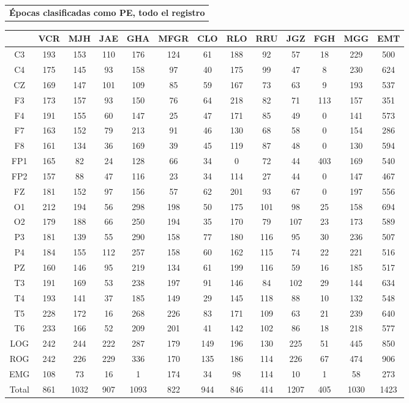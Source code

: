 \documentclass[12pt,a4paper]{mitthesis}
\begin{document}

\begin{SidewaysFigure}
\centering
\begin{tabular}{c}
\textbf{\'Epocas clasificadas como PE, todo el registro}
\vspace{1em}
\end{tabular}
\begin{tabular}{c|ccccc|cccc|ccc}
& VCR & MJH & JAE & GHA & MFGR
& CLO & RLO & RRU & JGZ
& FGH & MGG & EMT \\
\hline
C3&193&153&110&176&124&61&188&92&57&18&229&500 \\
C4&175&145&93&158&97&40&175&99&47&8&230&624 \\
CZ&169&147&101&109&85&59&167&73&63&9&193&537 \\
F3&173&157&93&150&76&64&218&82&71&113&157&351 \\
F4&191&155&60&147&25&47&171&85&49&0&141&573 \\
F7&163&152&79&213&91&46&130&68&58&0&154&286 \\
F8&161&134&36&169&39&45&119&87&48&0&130&594 \\
FP1&165&82&24&128&66&34&0&72&44&403&169&540 \\
FP2&157&88&47&116&23&34&114&27&44&0&147&467 \\
FZ&181&152&97&156&57&62&201&93&67&0&197&556 \\
O1&212&194&56&298&198&50&175&101&98&25&158&694 \\
O2&179&188&66&250&194&35&170&79&107&23&173&589 \\
P3&181&139&55&290&158&77&180&116&95&30&236&507 \\
P4&184&155&112&257&158&60&162&115&74&22&221&516 \\
PZ&160&146&95&219&134&61&199&116&59&16&185&517 \\
T3&191&169&53&238&197&91&146&84&102&29&144&634 \\
T4&193&141&37&185&149&29&145&118&88&10&132&548 \\
T5&228&172&16&268&226&83&171&109&63&21&239&640 \\
T6&233&166&52&209&201&41&142&102&86&18&218&577 \\
LOG&242&244&222&287&179&149&196&130&225&51&445&850 \\
ROG&242&226&229&336&170&135&186&114&226&67&474&906 \\
EMG&108&73&16&1&174&34&98&114&10&1&58&273 \\
\hline
Total&861&1032&907&1093&822&944&846&414&1207&405&1030&1423
\end{tabular}
\caption{Total de \'epocas PE registradas (todas las fases) para cada canal. En la \'ultima fila se 
reporta el n\'umero total de \'epocas registradas para cada sujeto (en todos los canales se 
registr\'o la misma cantidad de \'epocas).
}
\label{total_gpos_total}
\end{SidewaysFigure}
\end{document}
